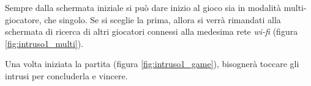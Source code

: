 Sempre dalla schermata iniziale si può dare inizio al gioco sia in modalità multi-giocatore, che singolo. Se si sceglie la prima, allora si verrà rimandati alla schermata di ricerca di altri giocatori connessi alla medesima rete \textit{wi-fi} (figura \ref{fig:intruso1_multi}).


Una volta iniziata la partita (figura \ref{fig:intruso1_game}), bisognerà toccare gli intrusi per concluderla e vincere.

